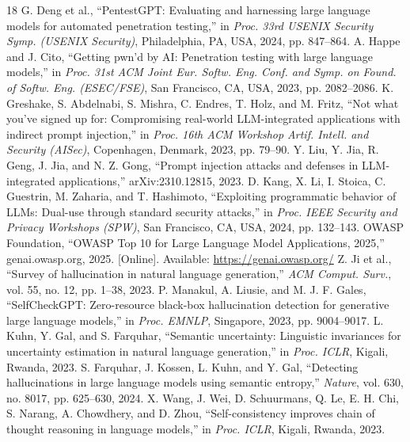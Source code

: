 \documentclass[conference]{IEEEtran}
\begin{document}
\begin{thebibliography}{18}
 G. Deng et al., ``PentestGPT: Evaluating and harnessing large language models for automated penetration testing,'' in \emph{Proc. 33rd USENIX Security Symp. (USENIX Security)}, Philadelphia, PA, USA, 2024, pp. 847--864.
 A. Happe and J. Cito, ``Getting pwn'd by AI: Penetration testing with large language models,'' in \emph{Proc. 31st ACM Joint Eur. Softw. Eng. Conf. and Symp. on Found. of Softw. Eng. (ESEC/FSE)}, San Francisco, CA, USA, 2023, pp. 2082--2086.
 K. Greshake, S. Abdelnabi, S. Mishra, C. Endres, T. Holz, and M. Fritz, ``Not what you've signed up for: Compromising real-world LLM-integrated applications with indirect prompt injection,'' in \emph{Proc. 16th ACM Workshop Artif. Intell. and Security (AISec)}, Copenhagen, Denmark, 2023, pp. 79--90.
 Y. Liu, Y. Jia, R. Geng, J. Jia, and N. Z. Gong, ``Prompt injection attacks and defenses in LLM-integrated applications,'' arXiv:2310.12815, 2023.
 D. Kang, X. Li, I. Stoica, C. Guestrin, M. Zaharia, and T. Hashimoto, ``Exploiting programmatic behavior of LLMs: Dual-use through standard security attacks,'' in \emph{Proc. IEEE Security and Privacy Workshops (SPW)}, San Francisco, CA, USA, 2024, pp. 132--143.
 OWASP Foundation, ``OWASP Top 10 for Large Language Model Applications, 2025,'' genai.owasp.org, 2025. [Online]. Available: \url{https://genai.owasp.org/}
 Z. Ji et al., ``Survey of hallucination in natural language generation,'' \emph{ACM Comput. Surv.}, vol. 55, no. 12, pp. 1--38, 2023.
 P. Manakul, A. Liusie, and M. J. F. Gales, ``SelfCheckGPT: Zero-resource black-box hallucination detection for generative large language models,'' in \emph{Proc. EMNLP}, Singapore, 2023, pp. 9004--9017.
 L. Kuhn, Y. Gal, and S. Farquhar, ``Semantic uncertainty: Linguistic invariances for uncertainty estimation in natural language generation,'' in \emph{Proc. ICLR}, Kigali, Rwanda, 2023.
 S. Farquhar, J. Kossen, L. Kuhn, and Y. Gal, ``Detecting hallucinations in large language models using semantic entropy,'' \emph{Nature}, vol. 630, no. 8017, pp. 625--630, 2024.
 X. Wang, J. Wei, D. Schuurmans, Q. Le, E. H. Chi, S. Narang, A. Chowdhery, and D. Zhou, ``Self-consistency improves chain of thought reasoning in language models,'' in \emph{Proc. ICLR}, Kigali, Rwanda, 2023.

\end{thebibliography}
\end{document}
